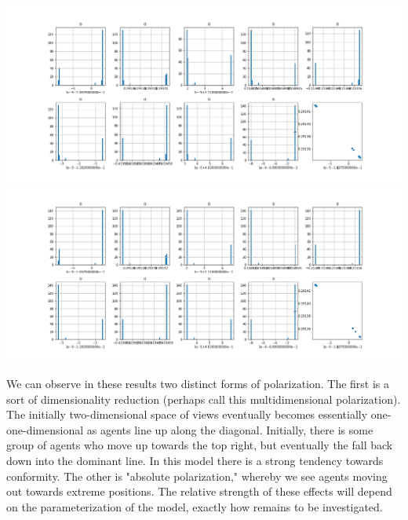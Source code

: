 \documentclass{article}
\begin{document}
\begin{center}
\includegraphics[width=\linewidth]{200_10_0_9_48.png}
\includegraphics[width=\linewidth]{200_10_0_9_58.png}

\end{center}

We can observe in these results two distinct forms of polarization. The first is a sort of dimensionality reduction (perhaps call this multidimensional polarization). The initially two-dimensional space of views eventually becomes essentially one-one-dimensional as agents line up along the diagonal. Initially, there is some group of agents who move up towards the top right, but eventually the fall back down into the dominant line. In this model there is a strong tendency towards conformity. The other is "absolute polarization," whereby we see agents moving out towards extreme positions. The relative strength of these effects will depend on the parameterization of the model, exactly how remains to be investigated.
\end{document}
